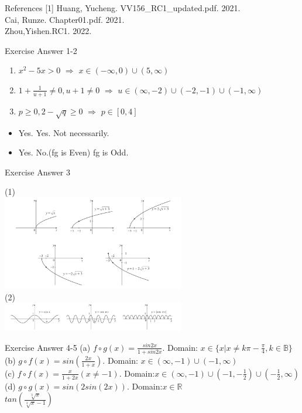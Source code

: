 \documentclass{beamer}
\begin{document}
\begin{frame}{References}
	[1] Huang, Yucheng. VV156\_RC1\_updated.pdf. 2021.\\
	\bigskip
	[2] Cai, Runze. Chapter01.pdf. 2021.\\
	\bigskip
	[3] Zhou,Yishen.RC1. 2022.
\end{frame}

\begin{frame}{Exercise Answer 1-2}
    \begin{enumerate}
        \item $x^2-5x>0$ $\Rightarrow$ $x\in (-\infty,0)\cup (5,\infty)$
        \item $1+\frac{1}{u+1}\neq0,u+1\neq0$ $\Rightarrow$ $u\in (\infty,-2)\cup(-2,-1)\cup (-1,\infty)$
        \item $p\geq0,2-\sqrt{q}\geq0$ $\Rightarrow$ $p\in [0,4]$
    \end{enumerate}
    \vspace{1.5cm}
    \begin{itemize}
        \item Yes. Yes. Not necessarily.
        \item Yes. No.(fg is Even) fg is Odd.
    \end{itemize}
\end{frame}


\begin{frame}{Exercise Answer 3}
\begin{center}
    (1)\\
    \includegraphics[width =8cm]{514.png}\\
    \vspace{1cm}
    (2)\\
    \includegraphics[width =8cm]{114.png}
\end{center}
\end{frame}

\begin{frame}{Exercise Answer 4-5}
    (a) $f\circ g(x)=\frac{sin 2x}{1+sin 2x}$. Domain: $x\in\{x|x\neq k\pi-\frac{\pi}{4},k\in\mathbb{B}\}$\\
    (b) $g\circ f(x)=sin(\frac{2x}{1+x})$. Domain: $x\in (\infty,-1)\cup(-1,\infty)$\\
    (c) $f\circ f(x)=\frac{x}{1+2x}(x\neq-1)$. Domain:$x\in (\infty,-1)\cup(-1,-\frac{1}{2})\cup (-\frac{1}{2},\infty)$\\
    (d) $g\circ g(x)=sin(2sin(2x))$. Domain:$x\in\mathbb{R}$\\
    \vspace{1.5cm}
    $tan(\frac{\sqrt[3]{x}}{\sqrt[3]{x}-1})$
\end{frame}
\end{document}
